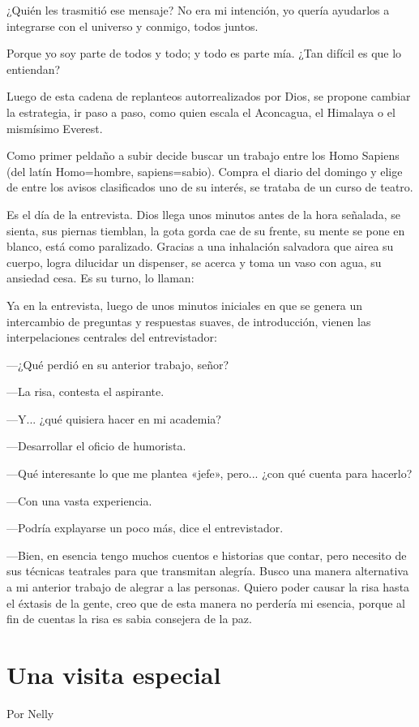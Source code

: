 \documentclass[11pt,twoside,openright,a5paper]{book}
\begin{document}
¿Quién les trasmitió ese mensaje? No era mi intención, yo quería ayudarlos a integrarse con el universo y conmigo, todos juntos. 

Porque yo soy parte de todos y todo; y todo es parte mía. ¿Tan difícil es que lo entiendan?

Luego de esta cadena de replanteos autorrealizados por Dios, se propone cambiar la estrategia, ir paso a paso, como quien escala el Aconcagua, el Himalaya o el mismísimo Everest. 

Como primer peldaño a subir decide buscar un trabajo entre los Homo Sapiens (del latín Homo=hombre, sapiens=sabio). Compra el diario del domingo y elige de entre los avisos clasificados uno de su interés, se trataba de un curso de teatro.

Es el día de la entrevista. Dios llega unos minutos antes de la hora señalada, se sienta, sus piernas tiemblan, la gota gorda cae de su frente, su mente se pone en blanco, está como paralizado. Gracias a una inhalación salvadora que airea su cuerpo, logra dilucidar un dispenser, se acerca y toma un vaso con agua, su ansiedad cesa. Es su turno, lo llaman:

Ya en la entrevista, luego de unos minutos iniciales en que se genera un intercambio de preguntas y respuestas suaves, de introducción, vienen las interpelaciones centrales del entrevistador:

---¿Qué perdió en su anterior trabajo, señor? 

---La risa, contesta el aspirante.

---Y... ¿qué quisiera hacer en mi academia?

---Desarrollar el oficio de humorista.

---Qué interesante lo que me plantea «jefe», pero... ¿con qué cuenta para hacerlo? 

---Con una vasta experiencia.

---Podría explayarse un poco más, dice el entrevistador.

---Bien, en esencia tengo muchos cuentos e historias que contar, pero necesito de sus técnicas teatrales para que transmitan alegría. Busco una manera alternativa a mi anterior trabajo de alegrar a las personas. Quiero poder causar la risa hasta el éxtasis de la gente, creo que de esta manera no perdería mi esencia, porque al fin de cuentas la risa es sabia consejera de la paz.

\section*{Una visita especial}
                                                                                              \begin{flushright}Por Nelly\end{flushright}
 
\end{document}
